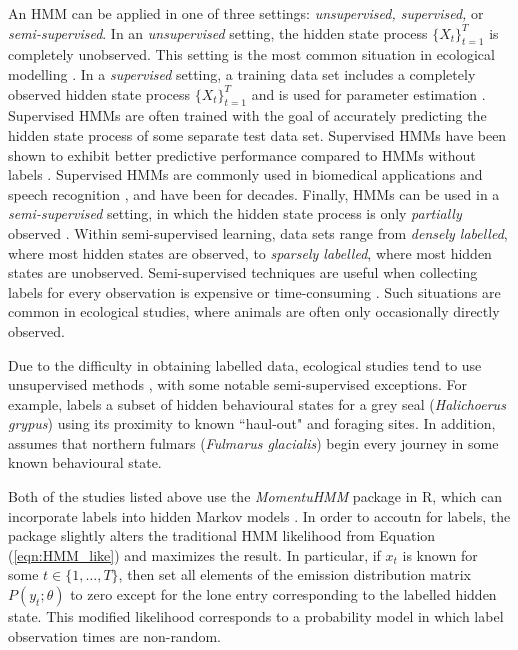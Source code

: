 An HMM can be applied in one of three settings: \textit{unsupervised, supervised,} or \textit{semi-supervised}. In an \textit{unsupervised} setting, the hidden state process $\{X_t\}_{t=1}^T$ is completely unobserved. This setting is the most common situation in ecological modelling \citep{Adam:2019, Pirotta:2018, Barajas:2017, Patterson:2017}. In a \textit{supervised} setting, a training data set includes a completely observed hidden state process $\{X_t\}_{t=1}^T$ and is used for parameter estimation \citep{Krough:1994}. Supervised HMMs are often trained with the goal of accurately predicting the hidden state process of some separate test data set. Supervised HMMs have been shown to exhibit better predictive performance compared to HMMs without labels \citep{Krogh:1997}. Supervised HMMs are commonly used in biomedical applications \citep{Tamposis:2018} and speech recognition \citep{Bagos:2003}, and have been for decades. Finally, HMMs can be used in a \textit{semi-supervised} setting, in which the hidden state process is only \textit{partially} observed \citep{Tamposis:2018,Bagos:2003,Li:2021}. Within semi-supervised learning, data sets range from \textit{densely labelled}, where most hidden states are observed, to \textit{sparsely labelled}, where most hidden states are unobserved. Semi-supervised techniques are useful when collecting labels for every observation is expensive or time-consuming \citep{Scheffer:2001}. Such situations are common in ecological studies, where animals are often only occasionally directly observed. 

Due to the difficulty in obtaining labelled data, ecological studies tend to use unsupervised methods \citep{Patterson:2017,McClintock:2020}, with some notable semi-supervised exceptions. For example, \citet{McClintock:2012} labels a subset of hidden behavioural states for a grey seal (\textit{Halichoerus grypus}) using its proximity to known ``haul-out" and foraging sites. In addition, \citet{Pirotta:2018} assumes that northern fulmars (\textit{Fulmarus glacialis}) begin every journey in some known behavioural state. 

Both of the studies listed above use the \textit{MomentuHMM} package in R, which can incorporate labels into hidden Markov models \citep{McClintock:2018}. In order to accoutn for labels, the package slightly alters the traditional HMM likelihood from Equation (\ref{eqn:HMM_like}) and maximizes the result. In particular, if $x_t$ is known for some $t \in \{1,\ldots,T\}$, then \citet{McClintock:2018} set all elements of the emission distribution matrix $P(y_t;\theta)$ to zero except for the lone entry corresponding to the labelled hidden state. This modified likelihood corresponds to a probability model in which label observation times are non-random.

